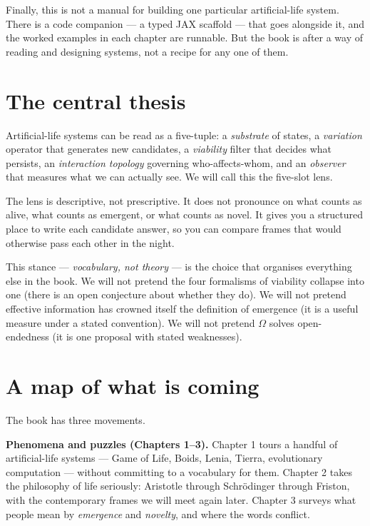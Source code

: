 Finally, this is not a manual for building one particular
artificial-life system. There is a code companion --- a typed JAX
scaffold --- that goes alongside it, and the worked examples in each
chapter are runnable. But the book is after a way of reading and
designing systems, not a recipe for any one of them.

\section*{The central thesis}

Artificial-life systems can be read as a five-tuple: a \emph{substrate}
of states, a \emph{variation} operator that generates new candidates, a
\emph{viability} filter that decides what persists, an
\emph{interaction topology} governing who-affects-whom, and an
\emph{observer} that measures what we can actually see. We will call
this the five-slot lens.

The lens is descriptive, not prescriptive. It does not pronounce on
what counts as alive, what counts as emergent, or what counts as novel.
It gives you a structured place to write each candidate answer, so you
can compare frames that would otherwise pass each other in the night.

This stance --- \emph{vocabulary, not theory} --- is the choice that
organises everything else in the book. We will not pretend the four
formalisms of viability collapse into one (there is an open conjecture
about whether they do). We will not pretend effective information has
crowned itself the definition of emergence (it is a useful measure
under a stated convention). We will not pretend $\Omega$ solves
open-endedness (it is one proposal with stated weaknesses).

\section*{A map of what is coming}

The book has three movements.

\textbf{Phenomena and puzzles (Chapters 1--3).} Chapter 1 tours a
handful of artificial-life systems --- Game of Life, Boids, Lenia,
Tierra, evolutionary computation --- without committing to a vocabulary
for them. Chapter 2 takes the philosophy of life seriously: Aristotle
through Schr\"odinger through Friston, with the contemporary frames we
will meet again later. Chapter 3 surveys what people mean by
\emph{emergence} and \emph{novelty}, and where the words conflict.

